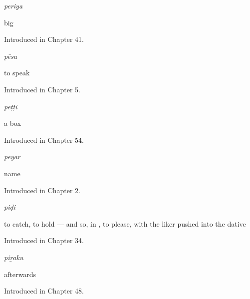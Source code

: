 \noindent\begin{minipage}[t]{\linewidth}
\raggedright
\textbf{}\enspace\emph{periya}\par
\small big\par
\footnotesize Introduced in Chapter 41.
\end{minipage}\par\medskip

\noindent\begin{minipage}[t]{\linewidth}
\raggedright
\textbf{}\enspace\emph{pēsu}\par
\small to speak\par
\footnotesize Introduced in Chapter 5.
\end{minipage}\par\medskip

\noindent\begin{minipage}[t]{\linewidth}
\raggedright
\textbf{}\enspace\emph{peṭṭi}\par
\small a box\par
\footnotesize Introduced in Chapter 54.
\end{minipage}\par\medskip

\noindent\begin{minipage}[t]{\linewidth}
\raggedright
\textbf{}\enspace\emph{peyar}\par
\small name\par
\footnotesize Introduced in Chapter 2.
\end{minipage}\par\medskip

\noindent\begin{minipage}[t]{\linewidth}
\raggedright
\textbf{}\enspace\emph{piḍi}\par
\small to catch, to hold — and so, in , to please, with the liker pushed into the dative\par
\footnotesize Introduced in Chapter 34.
\end{minipage}\par\medskip

\noindent\begin{minipage}[t]{\linewidth}
\raggedright
\textbf{}\enspace\emph{piṟaku}\par
\small afterwards\par
\footnotesize Introduced in Chapter 48.
\end{minipage}\par\medskip

